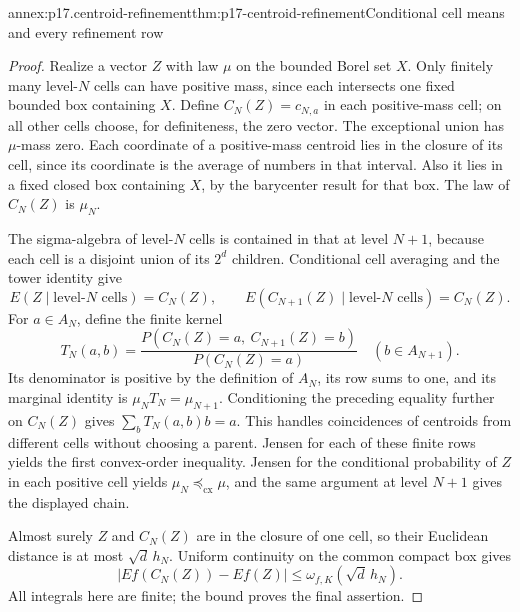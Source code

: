\begin{annexitem}{annex:p17.centroid-refinement}{thm:p17-centroid-refinement}{Conditional cell means and every refinement row}
\begin{proof}
Realize a vector \(Z\) with law \(\mu\) on the bounded Borel set \(X\).
Only finitely many level-\(N\) cells can have positive mass, since
each intersects one fixed bounded box containing \(X\).
Define \(C_N(Z)=c_{N,a}\) in each positive-mass cell; on all other
cells choose, for definiteness, the zero vector.
The exceptional union has \(\mu\)-mass zero. Each coordinate of a
positive-mass centroid lies in the closure of its cell, since its
coordinate is the average of numbers in that interval.
Also it lies in a fixed closed box containing \(X\), by the
barycenter result for that box. The law of \(C_N(Z)\) is \(\mu_N\).

The sigma-algebra of level-\(N\) cells is contained in that at level
\(N+1\), because each cell is a disjoint union of its \(2^d\)
children. Conditional cell averaging and the tower identity give
\[
 E(Z\mid\text{level-}N\text{ cells})=C_N(Z),\qquad
 E(C_{N+1}(Z)\mid\text{level-}N\text{ cells})=C_N(Z).
\]
For \(a\in A_N\), define the finite kernel
\[
 T_N(a,b)=
   \frac{P(C_N(Z)=a,\ C_{N+1}(Z)=b)}{P(C_N(Z)=a)}
                                               \quad(b\in A_{N+1}).
\]
Its denominator is positive by the definition of \(A_N\), its row
sums to one, and its marginal identity is \(\mu_NT_N=\mu_{N+1}\).
Conditioning the preceding equality further on \(C_N(Z)\) gives
\(\sum_bT_N(a,b)b=a\). This handles coincidences of centroids from
different cells without choosing a parent.
Jensen for each of these finite rows yields the first convex-order
inequality. Jensen for the conditional probability of \(Z\) in each
positive cell yields \(\mu_N\preceq_{\mathrm{cx}}\mu\), and the
same argument at level \(N+1\) gives the displayed chain.

Almost surely \(Z\) and \(C_N(Z)\) are in the closure of one cell,
so their Euclidean distance is at most \(\sqrt d\,h_N\).
Uniform continuity on the common compact box gives
\[
 |\!E f(C_N(Z))-Ef(Z)\!|
                  \leq\omega_{f,K}(\sqrt d\,h_N).
\]
All integrals here are finite; the bound proves the final assertion.
\end{proof}
\end{annexitem}

